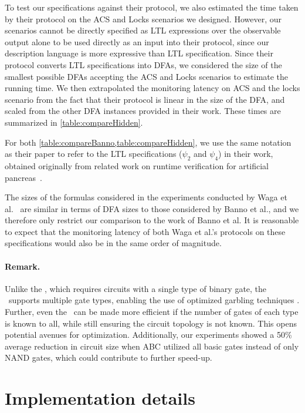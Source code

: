 To test our specifications against their protocol, we also estimated the time taken by their protocol on the ACS and Locks scenarios we designed. However, our scenarios cannot be directly specified as LTL expressions over the observable output alone to be used directly as an input into their protocol, since our description language is more expressive than LTL specification.
Since their protocol converts LTL specifications into DFAs, we considered the size of the smallest possible DFAs accepting the ACS and Locks scenarios to estimate the running time. We then extrapolated the monitoring latency on ACS and the locks scenario from the fact that their protocol is linear in the size of the DFA, and scaled from the other DFA instances provided in their work.
These times are summarized in \cref{table:compareHidden}.

For both \cref{table:compareBanno,table:compareHidden}, we use the same notation as their paper to refer to the LTL specifications ($\psi_2$ and $\psi_4$) in their work, obtained originally from related work on runtime verification for artificial pancreas~\cite{CFMS15}.

The sizes of the formulas considered in the experiments conducted by Waga et al.~\cite{WMSMBBS24} are similar in terms of DFA sizes to those considered by Banno et al., and we therefore only restrict our comparison to the work of Banno et al. It is reasonable to expect that the monitoring latency of both Waga et al.'s protocols on these specifications would also be in the same order of magnitude.

\paragraph{Remark.}
Unlike the \protocoltwo, which requires circuits with a single type of binary gate, the \protocolone~supports multiple gate types, enabling the use of optimized garbling techniques \cite{ZRE15,App16}.
Further, even the \protocoltwo~can be made more efficient if the number of gates of each type is known to all, while still ensuring the circuit topology is not known.
This opens potential avenues for optimization. Additionally, our experiments showed a 50\% average reduction in circuit size when ABC utilized all basic gates instead of only NAND gates, which could contribute to further speed-up.

\section{Implementation details}\label{sec:implementation}

